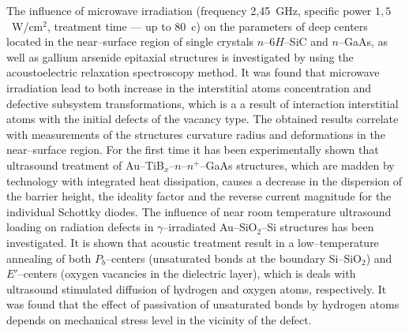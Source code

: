 The influence of microwave irradiation (frequency 2,45~GHz, specific power $1,5$~W/cm$^2$, treatment time --- up to 80~c) on the parameters of deep centers located in the near--surface region of single crystals $n$--6$H$--SiC and $n$--GaAs, as well as gallium arsenide epitaxial structures is investigated by using the acoustoelectric relaxation spectroscopy method.
It was found that microwave irradiation lead to both increase in the interstitial atoms concentration and defective subsystem transformations, which is a a result of interaction interstitial atoms with the initial defects of the vacancy type.
The obtained results correlate with measurements of the structures curvature radius and deformations in the near--surface region.
For the first time it has been experimentally shown that ultrasound treatment of Au--TiB$_x$--$n$--$n^+$--GaAs structures, which  are
madden by technology with integrated heat dissipation, causes a decrease in the dispersion of the barrier height, the ideality factor and the reverse current magnitude for the individual Schottky diodes.
The influence of near room temperature ultrasound loading on radiation defects in $\gamma$--irradiated Au--SiO$_2$--Si structures has been investigated.
It is shown that acoustic treatment result in a low--temperature annealing of both $P_b$--centers (unsaturated bonds at the boundary Si--SiO$_2$) and
$E'$--centers (oxygen vacancies in the dielectric layer), which is deals with ultrasound stimulated diffusion of hydrogen and oxygen atoms, respectively.
It was found that the effect of passivation of unsaturated bonds by hydrogen atoms depends on mechanical stress level in the vicinity of the defect.


\vspace{0.7cm}
\noindent
\keywordsEn

\vspace{2cm}



